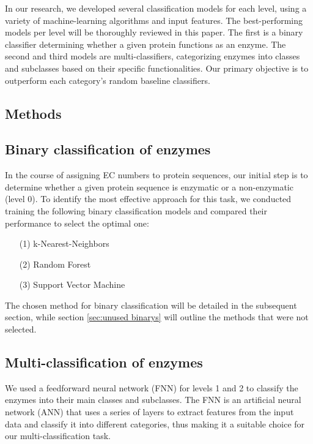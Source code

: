 \documentclass{bioinfo}
\begin{document}
In our research, we developed several classification models for each level, using a variety of machine-learning algorithms and input features.
The best-performing models per level will be thoroughly reviewed in this paper.
The first is a binary classifier determining whether a given protein functions as an enzyme. 
The second and third models are multi-classifiers, categorizing enzymes into classes and subclasses 
based on their specific functionalities. 
Our primary objective is to outperform each category's random baseline classifiers.

\begin{methods}
\section{Methods}
\subsection{Binary classification of enzymes}
In the course of assigning EC numbers to protein sequences,
our initial step is to determine whether a given protein sequence is enzymatic or a non-enzymatic (level 0).
To identify the most effective approach for this task,
we conducted training the following binary classification models and compared their performance to select the optimal one:
\begin{enumerate}
	\item[(1)] k-Nearest-Neighbors
	\item[(2)] Random Forest 
	\item[(3)] Support Vector Machine
\end{enumerate}

The chosen method for binary classification will be detailed in the subsequent section, while section \ref{sec:unused binarys} will outline the methods that were not selected.


\subsection{Multi-classification of enzymes}
We used a feedforward neural network (FNN) for levels 1 and 2 to classify the enzymes into their main classes and subclasses.
The FNN is an artificial neural network (ANN) that uses a series of layers to extract features from the input data and classify it into different categories,
thus making it a suitable choice for our multi-classification task. 


\end{methods}
\end{document}
